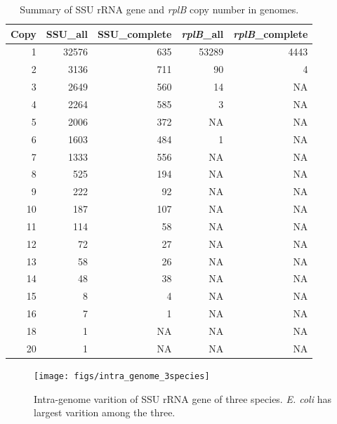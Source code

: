 \documentclass[]{msu-thesis}
\begin{document}
\begin{table}[htbp]
  \centering
  \caption[Summary of SSU rRNA gene and \textit{rplB} copy number in genomes]{Summary of SSU rRNA gene and \textit{rplB} copy number in genomes. }
    \begin{tabular}{|rrrrr|}
    \toprule
    \multicolumn{1}{|l}{Copy} & \multicolumn{1}{l}{SSU\_all} & \multicolumn{1}{l}{SSU\_complete} & \multicolumn{1}{l}{\textit{rplB}\_all} & \multicolumn{1}{l|}{\textit{rplB}\_complete} \\
    \midrule
    1     & 32576 & 635   & 53289 & 4443 \\
    2     & 3136  & 711   & 90    & 4 \\
    3     & 2649  & 560   & 14    & NA \\
    4     & 2264  & 585   & 3     & NA \\
    5     & 2006  & 372   & NA    & NA \\
    6     & 1603  & 484   & 1     & NA \\
    7     & 1333  & 556   & NA    & NA \\
    8     & 525   & 194   & NA    & NA \\
    9     & 222   & 92    & NA    & NA \\
    10    & 187   & 107   & NA    & NA \\
    11    & 114   & 58    & NA    & NA \\
    12    & 72    & 27    & NA    & NA \\
    13    & 58    & 26    & NA    & NA \\
    14    & 48    & 38    & NA    & NA \\
    15    & 8     & 4     & NA    & NA \\
    16    & 7     & 1     & NA    & NA \\
    18    & 1     & NA    & NA    & NA \\
    20    & 1     & NA    & NA    & NA \\
    \bottomrule
    \end{tabular}%
  \label{tab:S2}%
\end{table}%


\begin{figure}[tbph!]
  \centering
  \texttt{[image: figs/intra\_genome\_3species]}

  \caption[Intra-genome varition of SSU rRNA gene]{Intra-genome varition of SSU rRNA gene of three species. \textit{E. coli} has largest varition among the three.}

  \label{fig:intraGenome3species}
\end{figure}
\end{document}
